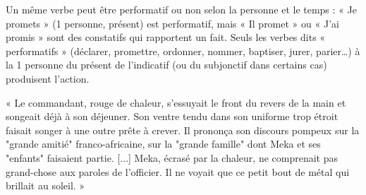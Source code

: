 \documentclass[11pt]{article}
\begin{document}
\begin{attention}
Un même verbe peut être performatif ou non selon la personne et le temps : « Je promets » (1\iere{} personne, présent) est performatif, mais « Il promet » ou « J'ai promis » sont des constatifs qui rapportent un fait. Seuls les verbes dits « performatifs » (déclarer, promettre, ordonner, nommer, baptiser, jurer, parier\ldots) à la 1\iere{} personne du présent de l'indicatif (ou du subjonctif dans certains cas) produisent l'action.
\end{attention}

\begin{exemplebox}
« Le commandant, rouge de chaleur, s'essuyait le front du revers de la main et songeait déjà à son déjeuner. Son ventre tendu dans son uniforme trop étroit faisait songer à une outre prête à crever. Il prononça son discours pompeux sur la "grande amitié" franco-africaine, sur la "grande famille" dont Meka et ses "enfants" faisaient partie. [...] Meka, écrasé par la chaleur, ne comprenait pas grand-chose aux paroles de l'officier. Il ne voyait que ce petit bout de métal qui brillait au soleil. »
\end{exemplebox}
\end{document}

